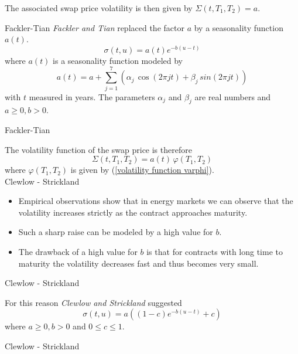 The associated swap price volatility is then given by $\Sigma(t,T_1,T_2)=a$.





{Fackler-Tian}
\emph{Fackler and Tian}  replaced the factor $a$ by a seasonality function $a(t)$.
\begin{equation}
\sigma(t,u) = a(t)e^{-b(u-t)}
\end{equation}
where $a(t)$ is a seasonality function modeled by
\begin{equation}
a(t)=a+\sum_{j=1}^{7}(\alpha_j\, \cos(2\pi jt)+ \beta_j \, sin(2\pi jt)) \label{seasonality function}
\end{equation}
with $t$  measured in years. The parameters $\alpha_j$ and $\beta_j$ are real numbers and $a \ge 0, b > 0$.



{Fackler-Tian}

The volatility function of the swap price is therefore
\begin{equation}
\Sigma(t,T_1,T_2)=a(t)\, \varphi(T_1,T_2)
\end{equation}
where $\varphi(T_1,T_2)$ is given by (\ref{volatility function varphi}).\\



{Clewlow - Strickland}
\begin{itemize}
\item<1-> Empirical observations show that in energy markets we can observe that the volatility increases strictly as the contract approaches maturity.
\item<2-> Such a sharp raise can be modeled by a high value for $b$.
\item<3-> The drawback of a high value for $b$ is that for contracts with long time to maturity the volatility decreases fast and thus becomes very small.
\end{itemize}



{Clewlow - Strickland}

For this reason \emph{Clewlow and Strickland} suggested
\begin{equation}
\sigma(t,u)=a((1-c)e^{-b(u-t)}+c) \label{Strickland model}
\end{equation}
where $a\ge 0, b > 0$ and $ 0 \le c\le 1$.



{Clewlow - Strickland}

